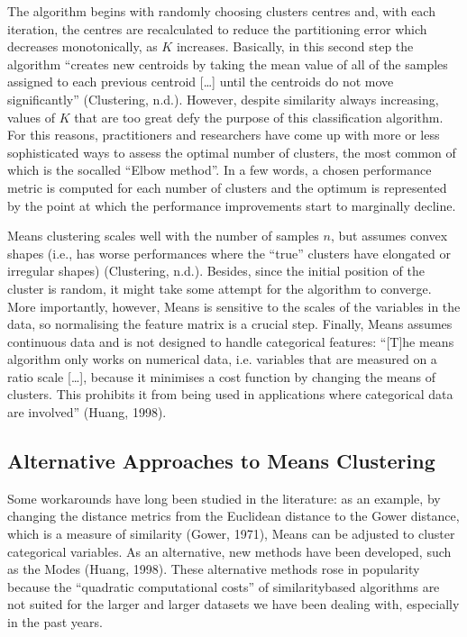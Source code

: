 \documentclass[letterpaper,10pt,english]{jupyterBook}
\begin{document}
\sphinxAtStartPar
The algorithm begins with randomly choosing clusters centres and, with each iteration, the centres are re\sphinxhyphen{}calculated to reduce the partitioning error \sphinxhyphen{} which decreases monotonically, as \(K\) increases. Basically, in this second step the algorithm “creates new centroids by taking the mean value of all of the samples assigned to each previous centroid {[}…{]} until the centroids do not move significantly” (Clustering, n.d.). However, despite similarity always increasing, values of \(K\) that are too great defy the purpose of this classification algorithm. For this reasons, practitioners and researchers have come up with more or less sophisticated ways to assess the optimal number of clusters, the most common of which is the so\sphinxhyphen{}called “Elbow method”. In a few words, a chosen performance metric is computed for each number of clusters and the optimum is represented by the point at which the performance improvements start to marginally decline.

\sphinxAtStartPar
{}\sphinxhyphen{}Means clustering scales well with the number of samples \(n\), but assumes convex shapes (i.e., has worse performances where the “true” clusters have elongated or irregular shapes) (Clustering, n.d.). Besides, since the initial position of the cluster is random, it might take some attempt for the algorithm to converge. More importantly, however, \sphinxhyphen{}Means is sensitive to the scales of the variables in the data, so normalising the feature matrix is a crucial step. Finally, \sphinxhyphen{}Means assumes continuous data and is not designed to handle categorical features: “{[}T{]}he \sphinxhyphen{}means algorithm only works on numerical data, i.e. variables that are measured on a ratio scale {[}…{]}, because it minimises a cost function by changing the means of clusters. This prohibits it from being used in applications where categorical data are involved” (Huang, 1998).


\subsection{Alternative Approaches to \sphinxhyphen{}Means Clustering}
\label{\detokenize{04-stations_kmeans:alternative-approaches-to-k-means-clustering}}
\sphinxAtStartPar
Some workarounds have long been studied in the literature: as an example, by changing the distance metrics from the Euclidean distance to the Gower distance, which is a measure of similarity (Gower, 1971), \sphinxhyphen{}Means can be adjusted to cluster categorical variables. As an alternative, new methods have been developed, such as the \sphinxhyphen{}Modes (Huang, 1998). These alternative methods rose in popularity because the “quadratic computational costs” of similarity\sphinxhyphen{}based algorithms are not suited for the larger and larger datasets we have been dealing with, especially in the past years.
\end{document}
